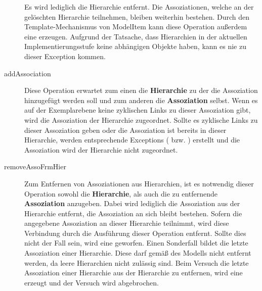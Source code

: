 \begin{description}
Es wird lediglich die Hierarchie entfernt. Die Assoziationen, welche an der gelöschten Hierarchie teilnehmen, bleiben weiterhin bestehen. Durch den Template-Mechanismus von ModelItem kann diese Operation außerdem eine  erzeugen. Aufgrund der Tatsache, dass Hierarchien in der aktuellen Implementierungsstufe keine abhängigen Objekte haben, kann es nie zu dieser Exception kommen.
\item[addAssociation] Diese Operation erwartet zum einen die \textbf{Hierarchie} zu der die Assoziation hinzugefügt werden soll und zum anderen die \textbf{Assoziation} selbst.
Wenn es auf der Exemplarebene keine zyklischen Links zu dieser Assoziation gibt, wird die Assoziation der Hierarchie zugeordnet. Sollte es zyklische Links
zu dieser Assoziation geben oder die Assoziation ist bereits in dieser Hierarchie, werden entsprechende Exceptions ( bzw. ) 
erstellt und die Assoziation wird der Hierarchie nicht zugeordnet.
\item[removeAssoFrmHier] Zum Entfernen von Assoziationen aus Hierarchien, ist es notwendig dieser Operation sowohl die \textbf{Hierarchie}, als auch die zu entfernende 
\textbf{Assoziation} anzugeben. Dabei wird lediglich die Assoziation aus der Hierarchie entfernt, die Assoziation an sich bleibt bestehen. 
Sofern die angegebene Assoziation an dieser Hierarchie teilnimmt, wird diese Verbindung durch die Ausführung dieser Operation entfernt. 
Sollte dies nicht der Fall sein, wird eine  geworfen. Einen Sonderfall bildet die letzte Assoziation einer
Hierarchie. Diese darf gemäß des Modells nicht entfernt werden, da leere Hierarchien nicht zulässig sind. Beim Versuch die letzte
Assoziation einer Hierarchie aus der Hierarchie zu entfernen, wird eine  erzeugt und der Versuch wird abgebrochen. 
\end{description}
